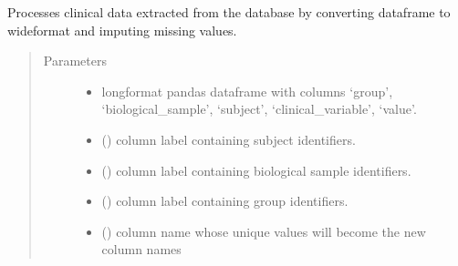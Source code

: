 \documentclass[letterpaper,10pt,english]{sphinxmanual}
\begin{document}
\begin{fulllineitems}
\label{\detokenize{_autosummary/analytics_core.analytics:analytics_core.analytics.analytics.get_clinical_measurements_ready}}
Processes clinical data extracted from the database by converting dataframe to wide\sphinxhyphen{}format and imputing missing values.
\begin{quote}\begin{description}
\item[{Parameters}] \leavevmode\begin{itemize}
\item {} 
 \textendash{} long\sphinxhyphen{}format pandas dataframe with columns ‘group’, ‘biological\_sample’, ‘subject’, ‘clinical\_variable’, ‘value’.

\item {} 
 () \textendash{} column label containing subject identifiers.

\item {} 
 () \textendash{} column label containing biological sample identifiers.

\item {} 
 () \textendash{} column label containing group identifiers.

\item {} 
 () \textendash{} column name whose unique values will become the new column names


\end{itemize}
\end{description}
\end{quote}
\end{fulllineitems}
\end{document}
